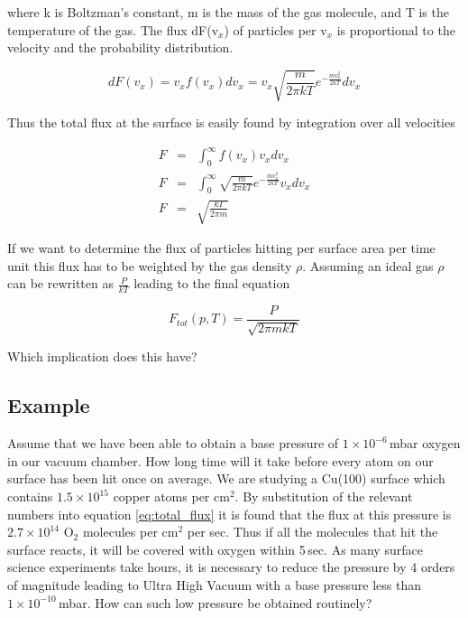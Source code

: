 where k is Boltzman's constant, m is the mass of the gas molecule, and T is the temperature of the gas. The flux dF(v$_{x}$) of particles per v$_{x}$ is proportional to the velocity and the probability distribution.

\begin{equation}
dF(v_x) = v_xf(v_x)dv_x = v_x\sqrt{\frac{m}{2 \pi kT}}e^{-\frac{mv_x^2}{2kT}}dv_x
\end{equation}

Thus the total flux at the surface is easily found by integration over all velocities

\begin{eqnarray}
F &=& \int_{0}^{\infty}f(v_x)v_xdv_x \\
F &=& \int_{0}^{\infty} \sqrt{\frac{m}{2 \pi kT}}e^{-\frac{mv_x^2}{2kT}}v_xdv_x \\
F &=& \sqrt{\frac{kT}{2\pi m}}
\end{eqnarray}

If we want to determine the flux of particles hitting per surface area per time unit this flux has to be weighted by the gas density $\rho$. Assuming an ideal gas $\rho$ can be rewritten as $\frac{P}{kT}$ leading to the final equation

\begin{equation}
F_{tot}(p,T) = \frac{P}{\sqrt{2 \pi mkT}}
\label{eq:total_flux}
\end{equation}

Which implication does this have?

\subsection{Example}
Assume that we have been able to obtain a base pressure of $1 \times 10^{-6}\,$mbar oxygen in our vacuum chamber. How long time will it take before every atom on our surface has been hit once on average. We are studying a Cu(100) surface which contains $1.5 \times 10^{15}$ copper atoms per cm$^{2}$. By substitution of the relevant numbers into equation \ref{eq:total_flux} it is found that the flux at this pressure is $2.7 \times 10^{14}$ O$_{2}$ molecules per cm$^{2}$ per sec. Thus if all the molecules that hit the surface reacts, it will be covered with oxygen within 5\,sec. As many surface science experiments take hours, it is necessary to reduce the pressure by 4 orders of magnitude leading to Ultra High Vacuum with a base pressure less than $1 \times 10^{-10}\,$mbar. How can such low pressure be obtained routinely?


